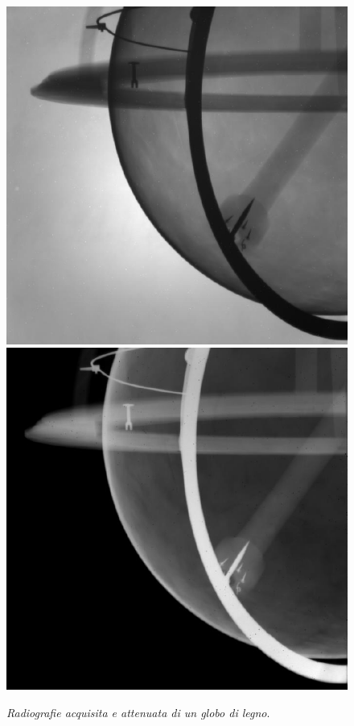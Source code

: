 \documentclass{report}
\numberwithin{equation}{section}
\numberwithin{figure}{section}
\begin{document}
\begin{figure}[htp]
\centering
\includegraphics[scale=0.58]{immagini/globo1.png}\quad\includegraphics[scale=0.577]{immagini/globo2.png}
\caption{\label{fig:globo} \textit{Radiografie acquisita e attenuata di un globo di legno}.}
\end{figure}
\end{document}

